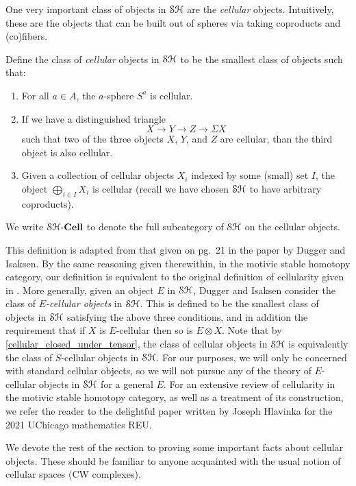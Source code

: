 \documentclass[../main.tex]{subfiles}
\begin{document}
One very important class of objects in $\mathcal{SH}$ are the \emph{cellular} objects. Intuitively, these are the objects that can be built out of spheres via taking coproducts and (co)fibers.

\begin{definition}\label{cellular}
	Define the class of \emph{cellular} objects in $\mathcal{SH}$ to be the smallest class of objects such that:
	\begin{enumerate}
		\item For all $a\in A$, the $a$-sphere $S^a$ is cellular.
		\item If we have a distinguished triangle
		\[X\to Y\to Z\to\Sigma X\]
		such that two of the three objects $X$, $Y$, and $Z$ are cellular, than the third object is also cellular.
		\item Given a collection of cellular objects $X_i$ indexed by some (small) set $I$, the object $\bigoplus_{i\in I} X_i$ is cellular (recall we have chosen $\mathcal{SH}$ to have arbitrary coproducts).
	\end{enumerate}
	We write $\mathcal{SH}\text-\mathbf{Cell}$ to denote the full subcategory of $\mathcal{SH}$ on the cellular objects.
\end{definition}

This definition is adapted from that given on pg.\ 21 in the paper \cite{DugIsak} by Dugger and Isaksen. By the same reasoning given therewithin, in the motivic stable homotopy category, our definition is equivalent to the original definition of cellularity given in \cite{DugIsakCellular}. More generally, given an object $E$ in $\mathcal{SH}$, Dugger and Isaksen consider the class of \emph{$E$-cellular objects} in $\mathcal{SH}$. This is defined to be the smallest class of objects in $\mathcal{SH}$ satisfying the above three conditions, and in addition the requirement that if $X$ is $E$-cellular then so is $E\otimes X$. Note that by \autoref{cellular_closed_under_tensor}, the class of cellular objects in $\mathcal{SH}$ is equivalently the class of $S$-cellular objects in $\mathcal{SH}$. For our purposes, we will only be concerned with standard cellular objects, so we will not pursue any of the theory of $E$-cellular objects in $\mathcal{SH}$ for a general $E$. For an extensive review of cellularity in the motivic stable homotopy category, as well as a treatment of its construction, we refer the reader to the delightful paper \cite{hlavinka_motivic} written by Joseph Hlavinka for the 2021 UChicago mathematics REU.

We devote the rest of the section to proving some important facts about cellular objects. These should be familiar to anyone acquainted with the usual notion of cellular spaces (CW complexes).
\end{document}
